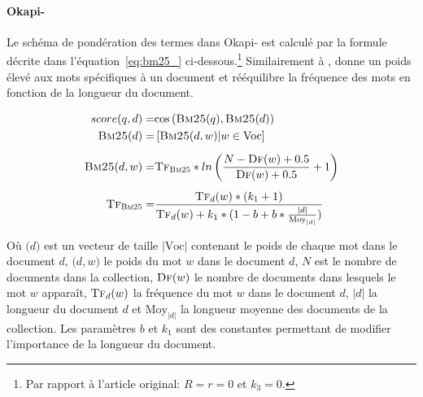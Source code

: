 

\paragraph{Okapi-\bm~\cite{robertson_okapi_1999}}
Le schéma de pondération des termes dans Okapi-\bm{} est calculé par la formule décrite dans l'équation~\ref{eq:bm25_} ci-dessous.\footnote{Par rapport à l'article original: $R = r = 0$ et $k_3 = 0$.}
Similairement à \tfidf{}, \bm{} donne un poids élevé aux mots spécifiques à un document et rééquilibre la fréquence des mots en fonction de la longueur du document.

\begin{align}
\begin{split}
    score(q, d) = & \text{cos}\left(\textsc{Bm25}(q), \textsc{Bm25}(d)\right) \\
    \textsc{Bm25}(d) = & \left[\textsc{Bm25}(d, w) | w \in \text{Voc}\right] \\[.5em]
    \textsc{Bm25}(d, w) = & \textsc{Tf}_{\textsc{Bm25}} *  ln \left(\frac{N - \textsc{Df}(w) + 0.5}{\textsc{Df}(w) + 0.5} + 1 \right) \\[.5em]
    \textsc{Tf}_{\textsc{Bm25}} = & \frac{\textsc{Tf}_d(w) * (k_1 + 1)}{\textsc{Tf}_d(w) + k_1 * (1 - b + b * \frac{|d|}{\text{Moy}_{|d|}})}
    \label{eq:bm25_}
\end{split}
\end{align}

Où $\bm(d)$ est un vecteur de taille $|\text{Voc}|$ contenant le poids de chaque mot dans le document $d$, $\bm(d, w)$ le poids du mot $w$ dans le document $d$, $N$ est le nombre de documents dans la collection, $\textsc{Df}(w)$ le nombre de documents dans lesquels le mot $w$ apparaît, $\textsc{Tf}_d(w)$ la fréquence du mot $w$ dans le document $d$, $|d|$ la longueur du document $d$ et $\text{Moy}_{|d|}$ la longueur moyenne des documents de la collection.
%
Les paramètres $b$ et $k_1$ sont des constantes permettant de modifier l'importance de la longueur du document.
%

